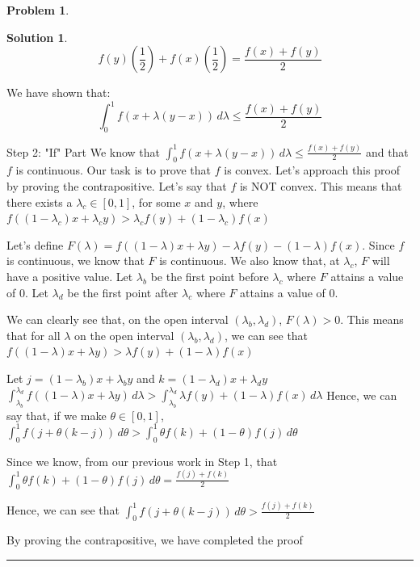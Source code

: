 \documentclass{article}
\theoremstyle{definition}
\newtheorem{problem}{Problem}
\def\fline{\rule{0.75\linewidth}{0.5pt}}
\newcommand{\finishline}{\begin{center}\fline\end{center}}
\newtheorem*{solution*}{Solution}
\newenvironment{solution}{\begin{solution*}}{{\finishline} \end{solution*}}
\begin{document}
\begin{problem}
\begin{solution}
    \begin{equation}
        \label{eq:example}
            f(y) (\frac{1}{2}) +  f(x) (\frac{1}{2}) = \frac{f(x) + f(y)}{2}
    \end{equation}

We have shown that: 
    \begin{equation}
        \label{eq:example}
            \int_{0}^{1} f(x + \lambda(y - x)) \,d \lambda \leq \frac{f(x) + f(y)}{2}
    \end{equation}

Step 2: "If" Part \newline 
We know that $\int_{0}^{1} f(x + \lambda(y - x)) \,d \lambda \leq \frac{f(x) + f(y)}{2}$ and that $f$ is continuous. Our task is to prove that $f$ is convex. Let's approach this proof by proving the contrapositive. Let's say that $f$ is NOT convex. This means that there exists a $\lambda_c \in [0, 1]$, for some $x$ and $y$, where  $f((1 - \lambda_c)x + \lambda_c y) > \lambda_c f(y) + (1 - \lambda_c) f(x)$ 

Let's define $F(\lambda) = f((1 - \lambda)x + \lambda y) - \lambda f(y) - (1 - \lambda) f(x)$. Since $f$ is continuous, we know that $F$ is continuous. We also know that, at $\lambda_c$, $F$ will have a positive value. Let $\lambda_b$ be the first point before $\lambda_c$ where $F$ attains a value of 0. Let $\lambda_d$ be the first point after $\lambda_c$ where $F$ attains a value of 0. 

We can clearly see that, on the open interval $(\lambda_b, \lambda_d)$, $F(\lambda) > 0$. This means that for all $\lambda$ on the open interval $(\lambda_b, \lambda_d)$,  we can see that $f((1 - \lambda)x + \lambda y) > \lambda f(y) + (1 - \lambda) f(x)$

Let $j = (1 - \lambda_b)x + \lambda_b y$ and $k = (1 - \lambda_d)x + \lambda_d y$ \newline
$\int_{\lambda_b}^{\lambda_d} f((1 - \lambda)x + \lambda y) \,d \lambda > \int_{\lambda_b}^{\lambda_d} \lambda f(y) + (1 - \lambda) f(x) \,d \lambda$ \newline 
Hence, we can say that, if we make $\theta \in [0, 1]$,  $\int_{0}^{1} f(j + \theta(k - j)) \,d \theta > \int_{0}^{1} \theta f(k) + (1 - \theta) f(j) \,d \theta$

Since we know, from our previous work in Step 1, that $\int_{0}^{1} \theta f(k) + (1 - \theta) f(j) \,d \theta = \frac{f(j) + f(k)}{2}$

Hence, we can see that $\int_{0}^{1} f(j + \theta(k - j)) \,d \theta > \frac{f(j) + f(k)}{2}$

By proving the contrapositive, we have completed the proof
    \end{solution}
    
\end{problem}
\end{document}
